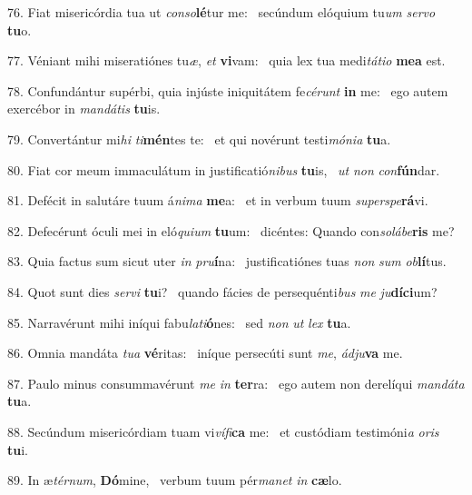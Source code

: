 76. Fiat misericórdia tua ut \textit{con}\textit{so}\textbf{lé}tur me: \ast\  secúndum elóquium tu\textit{um} \textit{ser}\textit{vo} \textbf{tu}o.\

77. Véniant mihi miseratiónes tu\textit{æ}, \textit{et} \textbf{vi}vam: \ast\  quia lex tua medi\textit{tá}\textit{ti}\textit{o} \textbf{me}\textbf{a} est.\

78. Confundántur supérbi, quia injúste iniquitátem fe\textit{cé}\textit{runt} \textbf{in} me: \ast\  ego autem exercébor in \textit{man}\textit{dá}\textit{tis} \textbf{tu}is.\

79. Convertántur mi\textit{hi} \textit{ti}\textbf{mén}tes te: \ast\  et qui novérunt testi\textit{mó}\textit{ni}\textit{a} \textbf{tu}a.\

80. Fiat cor meum immaculátum in justificatió\textit{ni}\textit{bus} \textbf{tu}is, \ast\  \textit{ut} \textit{non} \textit{con}\textbf{fún}dar.\

81. Defécit in salutáre tuum á\textit{ni}\textit{ma} \textbf{me}a: \ast\  et in verbum tuum \textit{su}\textit{per}\textit{spe}\textbf{rá}vi.\

82. Defecérunt óculi mei in eló\textit{qui}\textit{um} \textbf{tu}um: \ast\  dicéntes: Quando con\textit{so}\textit{lá}\textit{be}\textbf{ris} me?\

83. Quia factus sum sicut uter \textit{in} \textit{pru}\textbf{í}na: \ast\  justificatiónes tuas \textit{non} \textit{sum} \textit{ob}\textbf{lí}tus.\

84. Quot sunt dies \textit{ser}\textit{vi} \textbf{tu}i? \ast\  quando fácies de persequénti\textit{bus} \textit{me} \textit{ju}\textbf{dí}\textbf{ci}um?\

85. Narravérunt mihi iníqui fabu\textit{la}\textit{ti}\textbf{ó}nes: \ast\  sed \textit{non} \textit{ut} \textit{lex} \textbf{tu}a.\

86. Omnia mandáta \textit{tu}\textit{a} \textbf{vé}ritas: \ast\  iníque persecúti sunt \textit{me}, \textit{ád}\textit{ju}\textbf{va} me.\

87. Paulo minus consummavérunt \textit{me} \textit{in} \textbf{ter}ra: \ast\  ego autem non derelíqui \textit{man}\textit{dá}\textit{ta} \textbf{tu}a.\

88. Secúndum misericórdiam tuam vi\textit{ví}\textit{fi}\textbf{ca} me: \ast\  et custódiam testimóni\textit{a} \textit{o}\textit{ris} \textbf{tu}i.\

89. In æ\textit{tér}\textit{num}, \textbf{Dó}mine, \ast\  verbum tuum pér\textit{ma}\textit{net} \textit{in} \textbf{cæ}lo.\


